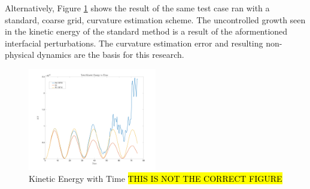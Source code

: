 Alternatively, Figure \ref{fig:stdKE} shows the result of the same test case ran with a standard, coarse grid, curvature estimation scheme. The uncontrolled growth seen in the kinetic energy of the standard method is a result of the aformentioned interfacial perturbations. The curvature estimation error and resulting non-physical dynamics are the basis for this research. 
\begin{figure}[h]
	\centering
	\includegraphics[width=0.5\textwidth]{figs/KEvT}
	\caption{Kinetic Energy with Time \hl{THIS IS NOT THE CORRECT FIGURE}}
	\label{fig:stdKE}
\end{figure}